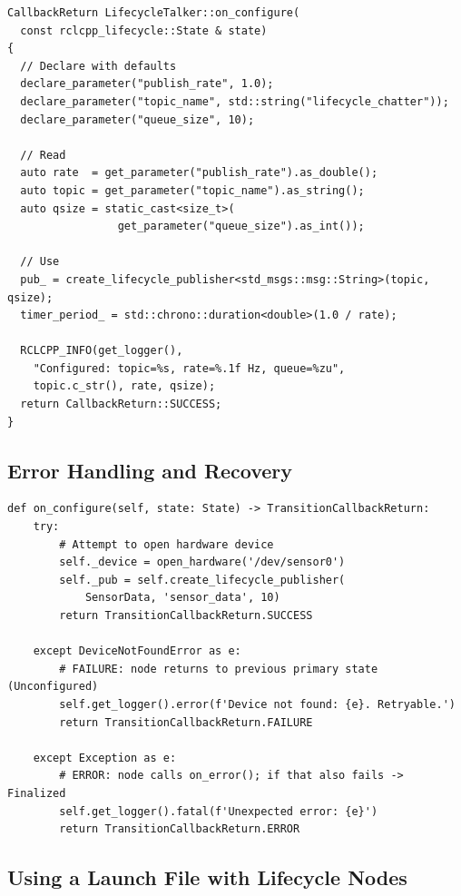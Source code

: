 \documentclass[11pt,a4paper]{csarticle}
\begin{document}
\begin{lstlisting}[style=cpp,caption={Declaring parameters in on\_configure (C++)}]
CallbackReturn LifecycleTalker::on_configure(
  const rclcpp_lifecycle::State & state)
{
  // Declare with defaults
  declare_parameter("publish_rate", 1.0);
  declare_parameter("topic_name", std::string("lifecycle_chatter"));
  declare_parameter("queue_size", 10);

  // Read
  auto rate  = get_parameter("publish_rate").as_double();
  auto topic = get_parameter("topic_name").as_string();
  auto qsize = static_cast<size_t>(
                 get_parameter("queue_size").as_int());

  // Use
  pub_ = create_lifecycle_publisher<std_msgs::msg::String>(topic, qsize);
  timer_period_ = std::chrono::duration<double>(1.0 / rate);

  RCLCPP_INFO(get_logger(),
    "Configured: topic=%s, rate=%.1f Hz, queue=%zu",
    topic.c_str(), rate, qsize);
  return CallbackReturn::SUCCESS;
}
\end{lstlisting}

\subsection{Error Handling and Recovery}

\begin{lstlisting}[style=python,caption={Returning FAILURE vs ERROR (Python)}]
def on_configure(self, state: State) -> TransitionCallbackReturn:
    try:
        # Attempt to open hardware device
        self._device = open_hardware('/dev/sensor0')
        self._pub = self.create_lifecycle_publisher(
            SensorData, 'sensor_data', 10)
        return TransitionCallbackReturn.SUCCESS

    except DeviceNotFoundError as e:
        # FAILURE: node returns to previous primary state (Unconfigured)
        self.get_logger().error(f'Device not found: {e}. Retryable.')
        return TransitionCallbackReturn.FAILURE

    except Exception as e:
        # ERROR: node calls on_error(); if that also fails -> Finalized
        self.get_logger().fatal(f'Unexpected error: {e}')
        return TransitionCallbackReturn.ERROR
\end{lstlisting}

\subsection{Using a Launch File with Lifecycle Nodes}
\end{document}
